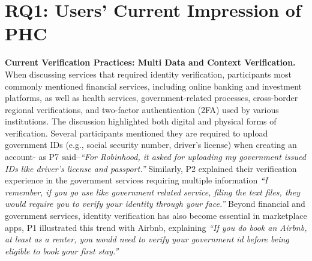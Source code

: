 

\section{RQ1: Users’ Current Impression of PHC}


\textbf{Current Verification Practices: Multi Data and Context Verification.} 
When discussing services that required identity verification, participants most commonly mentioned financial services, including online banking and investment platforms, as well as health services, government-related processes, cross-border regional verifications, and two-factor authentication (2FA) used by various institutions. The discussion highlighted both digital and physical forms of verification. Several participants mentioned they are required to upload government IDs (e.g., social security number, driver's license) when creating an account- as P7 said--\textit{``For Robinhood, it asked for uploading my government issued IDs like driver's license and passport.''} 
Similarly, P2 explained their verification experience in the government services requiring multiple information \textit{``I remember, if you go use like government related service, filing the text files, they would require you to verify your identity through your face.''} Beyond financial and government services, identity verification has also become essential in marketplace apps,
P1 illustrated this trend with Airbnb, explaining  \textit{``If you do book an Airbnb, at least as a renter, you would need to verify your government id before being eligible to book your first stay.''} 


